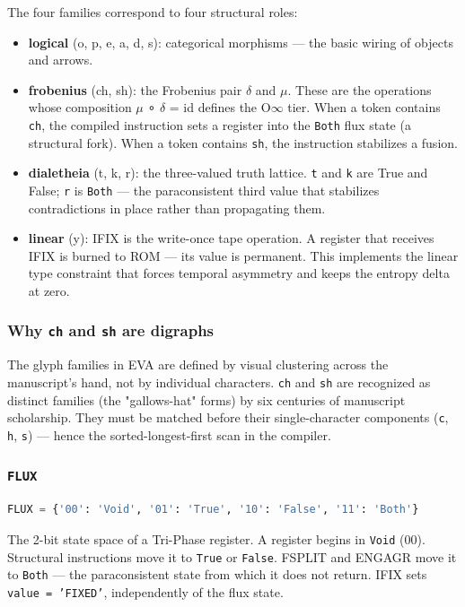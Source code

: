 \documentclass[12pt,a4paper]{article}
\begin{document}
The four families correspond to four structural roles:

\begin{itemize}
    \item \textbf{logical} (o, p, e, a, d, s): categorical morphisms --- the basic wiring of objects and arrows.
    \item \textbf{frobenius} (ch, sh): the Frobenius pair $\delta$ and $\mu$. These are the operations whose composition $\mu$ ∘ $\delta$ = id defines the O$\infty$ tier. When a token contains \texttt{ch}, the compiled instruction sets a register into the \texttt{Both} flux state (a structural fork). When a token contains \texttt{sh}, the instruction stabilizes a fusion.
    \item \textbf{dialetheia} (t, k, r): the three-valued truth lattice. \texttt{t} and \texttt{k} are True and False; \texttt{r} is \texttt{Both} --- the paraconsistent third value that stabilizes contradictions in place rather than propagating them.
    \item \textbf{linear} (y): IFIX is the write-once tape operation. A register that receives IFIX is burned to ROM --- its value is permanent. This implements the linear type constraint that forces temporal asymmetry and keeps the entropy delta at zero.
\end{itemize}

\subsubsection{Why \texttt{ch} and \texttt{sh} are digraphs}

The glyph families in EVA are defined by visual clustering across the manuscript's hand, not by individual characters. \texttt{ch} and \texttt{sh} are recognized as distinct families (the "gallows-hat" forms) by six centuries of manuscript scholarship. They must be matched before their single-character components (\texttt{c}, \texttt{h}, \texttt{s}) --- hence the sorted-longest-first scan in the compiler.

\subsubsection{\texttt{FLUX}}

\begin{lstlisting}[language=Python]
FLUX = {'00': 'Void', '01': 'True', '10': 'False', '11': 'Both'}
\end{lstlisting}

The 2-bit state space of a Tri-Phase register. A register begins in \texttt{Void} (00). Structural instructions move it to \texttt{True} or \texttt{False}. FSPLIT and ENGAGR move it to \texttt{Both} --- the paraconsistent state from which it does not return. IFIX sets \texttt{value = 'FIXED'}, independently of the flux state.
\end{document}
